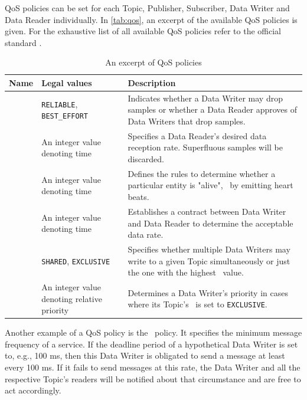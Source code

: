 QoS policies can be set for each Topic, Publisher, Subscriber, Data Writer and Data Reader individually. 
In \autoref{tab:qos}, an excerpt of the available QoS policies is given. For the exhaustive list of all available QoS policies refer to the official standard \cite{dds-1.4-standard}.

%
%
%
%
%
\begin{table}[H]
  \caption[An excerpt of DDS QoS policies]{An excerpt of QoS policies}\label{tab:qos}
  \centering
  \begin{tabular}{p{} p{}  p{}}
    \toprule
      \textbf{Name} & \textbf{Legal values} & \textbf{Description} \\
    \midrule
    	\reliability  & \texttt{RELIABLE}, \texttt{BEST\_EFFORT} & Indicates whether a Data Writer may drop samples or whether a Data Reader approves of Data Writers that drop samples.\\
    	\tbf  & An integer value denoting time & Specifies a Data Reader's desired data reception rate. Superfluous samples will be discarded.\\
    	\liveliness  & An integer value denoting time & Defines the rules to determine whether a particular entity is "alive", \eg\ by emitting heart beats. \\
    	\deadline  & An integer value denoting time & Establishes a contract between Data Writer and Data Reader to determine the acceptable data rate. \\
    	\ownership  & \texttt{SHARED}, \texttt{EXCLUSIVE} & Specifies whether multiple Data Writers may write to a given Topic simultaneously or just the one with the highest \ostrength\  value.\\
    	\ostrength  & An integer value denoting relative priority & Determines a Data Writer's priority in cases where its Topic's \ownership\ is set to \texttt{EXCLUSIVE}. \\
    \bottomrule
  \end{tabular}
\end{table}
%
%
%
%
%

Another example of a QoS policy is the \deadline\ policy. It specifies the minimum message frequency of a service. If the deadline period of a hypothetical Data Writer is set to, e.g., 100 ms, then this Data Writer is obligated to send a message at least every 100 ms. If it fails to send messages at this rate, the Data Writer and all the respective Topic's readers will be notified about that circumstance and are free to act accordingly.

